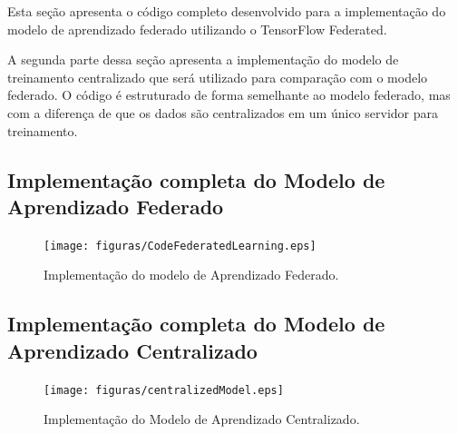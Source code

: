Esta seção apresenta o código completo desenvolvido para a implementação do modelo de aprendizado federado utilizando o TensorFlow Federated.

A segunda parte dessa seção apresenta a implementação do modelo de treinamento centralizado que será utilizado para comparação com o modelo federado. O código é estruturado de forma semelhante ao modelo federado, mas com a diferença de que os dados são centralizados em um único servidor para treinamento.

\subsection{Implementação completa do Modelo de Aprendizado Federado}

\begin{figure}[ht]
    \centering
    \texttt{[image: figuras/CodeFederatedLearning.eps]}
    \caption{Implementação do modelo de Aprendizado Federado.}
    \label{fig:CodeFederatedLearning}
\end{figure}

\subsection{Implementação completa do Modelo de Aprendizado Centralizado}

\begin{figure}[ht]
    \centering
    \texttt{[image: figuras/centralizedModel.eps]}
    \caption{Implementação do Modelo de Aprendizado Centralizado.}
    \label{fig:centralizedModel}
\end{figure}